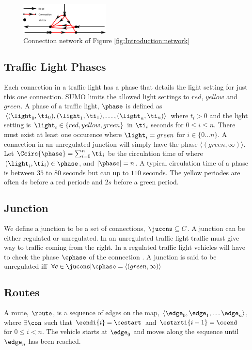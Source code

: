 \begin{figure}[h]
\centering
\includegraphics[width=0.4\textwidth]{../images/ConnectionNetwork.png}
\caption{Connection network of Figure \ref{fig:Introduction:network}}
\label{fig:Model:Connection}
\end{figure}

\subsection{Traffic Light Phases}\label{sec:phases}
Each connection in a traffic light has a phase that details the light setting for just this one connection.
SUMO limits the allowed light settings to $red$, $yellow$ and $green$.
A phase of a traffic light, $\phase$ is defined as $\langle(\light_0, \ti_0),(\light_1, \ti_1),\dots, (\light_n, \ti_n) \rangle$ where $t_i>0$ and the light setting is $\light_i\in \{red, yellow, green\}$ in $\ti_i$ seconds for $0 \leq i \leq n$.
There must exist at least one occurence where $\light_i = green$ for $i \in \{0 \dots n\}$. 
A connection in an unregulated junction will simply have the phase $\langle(green, \infty)\rangle$.
Let $\Ccirc{\phase} = \sum_{i=0}^{n}\ti_i$ be the circulation time of \phase where $(\light_i, \ti_i)\in \phase$, and $|\phase|=n$.
A typical circulation time of a phase is between $35$ to $80$ seconds but can up to $110$ seconds. 
The yellow periodes are often $4s$ before a red periode and $2s$ before a green period\cite{vejtrafik}.

\subsection{Junction}
We define a junction \ju to be a set of connections, $\jucons \subseteq C$. 
A junction can be either regulated or unregulated. 
In an unregulated traffic light traffic must give way to traffic coming from the right. 
In a regulated traffic light vehicles will have to check the phase $\cphase$ of the connection \vehpos. 
A junction is said to be unregulated iff $\forall c \in \jucons | \cphase = \langle(green, \infty)\rangle$

\subsection{Routes}
A route, $\route$, is a sequence of edges on the map, $\langle \edge_0, \edge_1, \dots \edge_n \rangle$, where $\exists \con$ such that $\eendi{i} = \cestart$ and $\estarti{i+1} = \ceend$ for $0\leq i< n$.
The vehicle starts at $\edge_0$ and moves along the sequence until $\edge_n$ has been reached.





